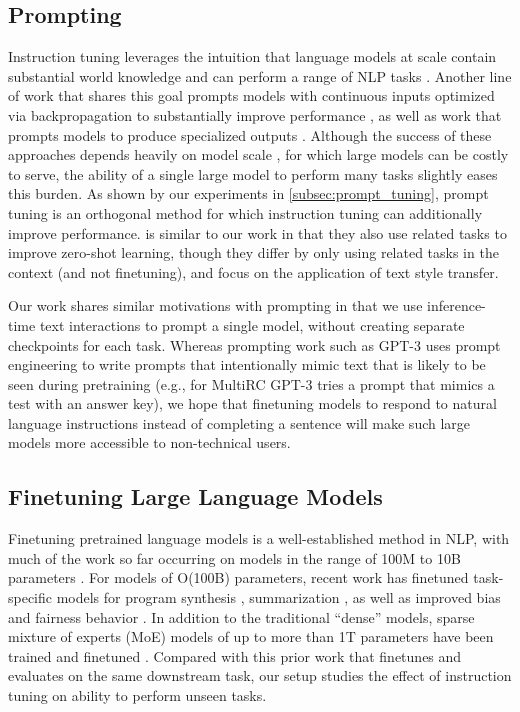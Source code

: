 \documentclass{article} %
\begin{document}
\subsection{Prompting}
Instruction tuning leverages the intuition that language models at scale contain substantial world knowledge and can perform a range of NLP tasks \citep[][see also \cite{Bommasani2021OnTO}]{brown2020language}.
Another line of work that shares this goal prompts models with continuous inputs optimized via backpropagation to substantially improve performance \citep{li-liang-2021-prefix,lester-prompt-tuning,qin-eisner-2021}, as well as work that prompts models to produce specialized outputs \citep{wei2022chain}.
Although the success of these approaches depends heavily on model scale \citep{lester-prompt-tuning}, for which large models can be costly to serve, the ability of a single large model to perform many tasks slightly eases this burden.
As shown by our experiments in \cref{subsec:prompt_tuning}, prompt tuning is an orthogonal method for which instruction tuning can additionally improve performance.
\citet{reif2021recipe} is similar to our work in that they also use related tasks to improve zero-shot learning, though they differ by only using related tasks in the context (and not finetuning), and focus on the application of text style transfer.

Our work shares similar motivations with prompting in that we use inference-time text interactions to prompt a single model, without creating separate checkpoints for each task. 
Whereas prompting work such as GPT-3 uses prompt engineering to write prompts that intentionally mimic text that is likely to be seen during pretraining (e.g., for MultiRC GPT-3 tries a prompt that mimics a test with an answer key), we hope that finetuning models to respond to natural language instructions instead of completing a sentence will make such large models more accessible to non-technical users.

\subsection{Finetuning Large Language Models}
Finetuning pretrained language models is a well-established method in NLP, with much of the work so far occurring on models in the range of 100M to 10B parameters \cite[][\textit{inter alia}]{dai2015semi,devlin-etal-2019-bert,raffel2019exploring,lewis-etal-2020-bart}.
For models of O(100B) parameters, recent work has finetuned task-specific models for program synthesis \citep{Austin2021ProgramSW,chen2021evaluating}, summarization \citep{wu2021recursively}, as well as improved bias and fairness behavior \citep{solaiman2021process}.
In addition to the traditional ``dense'' models, sparse mixture of experts (MoE) models of up to more than 1T parameters have been trained and finetuned \citep{lepikhin2020gshard,fedus2021switch}.  
Compared with this prior work that finetunes and evaluates on the same downstream task, our setup studies the effect of instruction tuning on ability to perform unseen tasks.
\end{document}
